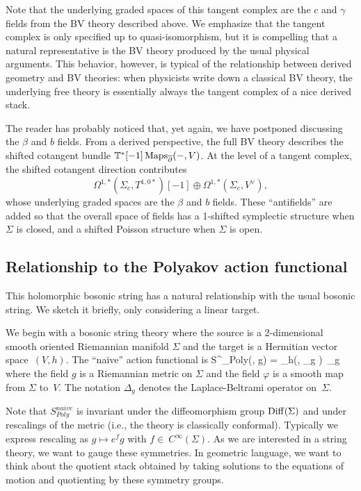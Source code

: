 Note that the underlying graded spaces of this tangent complex are the $c$ and $\gamma$ fields from the BV theory described above.
We emphasize that the tangent complex is only specified up to quasi-isomorphism,
but it is compelling that a natural representative is the BV theory produced by the usual physical arguments.
This behavior, however, is typical of the relationship between derived geometry and BV theories:
when physicists write down a classical BV theory, 
the underlying free theory is essentially always the tangent complex of a nice derived stack.

The reader has probably noticed that, yet again, we have postponed discussing the $\beta$ and $b$ fields.
From a derived perspective, the full BV theory describes the shifted cotangent bundle $\mathbb T^*[-1]\operatorname{Maps}_{\overline{\partial}}(-,V)$.
At the level of a tangent complex, the shifted cotangent direction contributes
\[
\Omega^{1,*}(\Sigma_c,T^{1,0*})[-1] \oplus \Omega^{1,*}(\Sigma_c,V^\vee),
\]
whose underlying graded spaces are the $\beta$ and $b$ fields.
These ``antifields'' are added so that the overall space of fields has a 1-shifted symplectic structure  when $\Sigma$ is closed, and a shifted Poisson structure when $\Sigma$ is open.

\subsection{Relationship to the Polyakov action functional}

This holomorphic bosonic string has a natural relationship with the usual bosonic string.
We sketch it briefly, only considering a linear target.

We begin with a bosonic string theory where the source is a 2-dimensional smooth oriented Riemannian manifold $\Sigma$ and the target is a Hermitian vector space~$(V,h)$. 
The ``naive'' action functional is
\ben
S^{}_{Poly}(\varphi, g) = \int_\Sigma h(\varphi, \Delta_{g} \varphi)\, \dvol_g
\een
where the field $g$ is a Riemannian metric on $\Sigma$ and the field $\varphi$ is a smooth map from $\Sigma$ to~$V$.
The notation $\Delta_g$ denotes the Laplace-Beltrami operator on~$\Sigma$. 

Note that $S^{naive}_{Poly}$ is invariant under the diffeomorphism group ${\rm Diff}(\Sigma)$ and under rescalings of the metric
(i.e., the theory is classically conformal).
Typically we express rescaling as $g \mapsto e^{f} g$ with $f \in~C^\infty(\Sigma)$.
As we are interested in a string theory, we want to gauge these symmetries.
In geometric language, we want to think about the quotient stack 
obtained by taking solutions to the equations of motion and quotienting by these symmetry groups.

